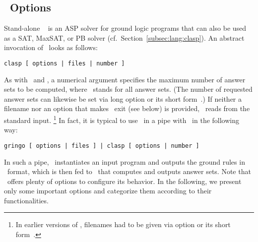 \subsection{\clasp\ Options}\label{subsec:opt:clasp}
Stand-alone \clasp~\cite{gekanesc07b} is an ASP solver for ground logic programs
that can also be used as a SAT, MaxSAT, or PB solver (cf.\ Section~\ref{subsec:lang:clasp}).
An abstract invocation of \clasp\ looks as follows:
%
\begin{lstlisting}[numbers=none]
clasp [ options | files | number ]
\end{lstlisting}
%
As with \clingo\ and \iclingo,
a numerical argument specifies the maximum number of answer sets to be computed,
where ~stands for all answer sets.
(The number of requested answer sets can likewise be set via long option
  or its short form~.)
If neither a filename nor an option that makes \clasp\ exit (see below) is provided,
\clasp\ reads from the standard input.%
\footnote{%
 In earlier versions of \clasp, filenames had to be given via option 
 or its short form~.}
In fact, it is typical to use \clasp\ in a pipe with \gringo\ in the following way:
\begin{lstlisting}[numbers=none]
gringo [ options | files ] | clasp [ options | number ]
\end{lstlisting}
In such a pipe, \gringo\ instantiates an input program and outputs the ground
rules in \smodels\ format,
which is then fed to \clasp\ that computes and outputs answer sets.
Note that \clasp\ offers plenty of options to configure its behavior.
In the following, we present only some important options
and categorize them according to their functionalities.


